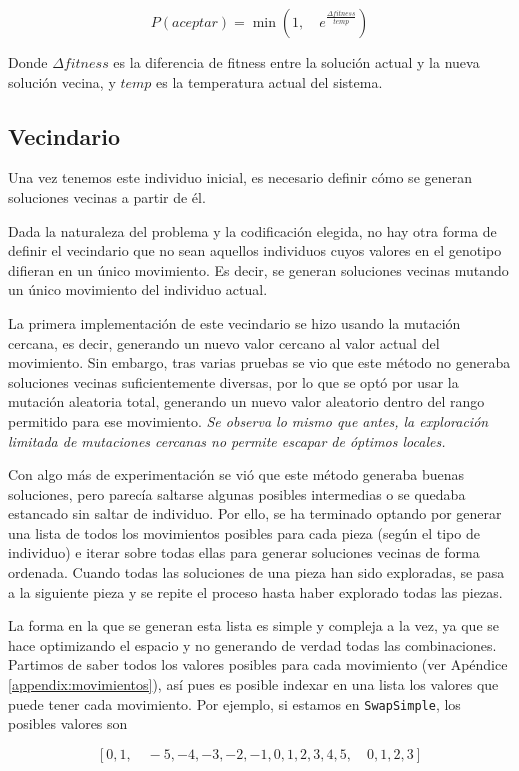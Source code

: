 \documentclass[11pt,spanish,listoffigures,listoftables]{tfgetsinf}
\begin{document}
$$
P(aceptar) = \min(1, \quad e^{\frac{\Delta fitness}{temp}})
$$

Donde $\Delta fitness$ es la diferencia de fitness entre la solución actual y la nueva solución vecina, y $temp$ es la temperatura actual del sistema.

\subsection{Vecindario}
Una vez tenemos este individuo inicial, es necesario definir cómo se generan soluciones vecinas a partir de él.

Dada la naturaleza del problema y la codificación elegida, no hay otra forma de definir el vecindario que no sean aquellos individuos cuyos valores en el genotipo difieran en un único movimiento. Es decir, se generan soluciones vecinas mutando un único movimiento del individuo actual.

La primera implementación de este vecindario se hizo usando la mutación cercana, es decir, generando un nuevo valor cercano al valor actual del movimiento. Sin embargo, tras varias pruebas se vio que este método no generaba soluciones vecinas suficientemente diversas, por lo que se optó por usar la mutación aleatoria total, generando un nuevo valor aleatorio dentro del rango permitido para ese movimiento. \textit{Se observa lo mismo que antes, la exploración limitada de mutaciones cercanas no permite escapar de óptimos locales.}

Con algo más de experimentación se vió que este método generaba buenas soluciones, pero parecía saltarse algunas posibles intermedias o se quedaba estancado sin saltar de individuo. Por ello, se ha terminado optando por generar una lista de todos los movimientos posibles para cada pieza (según el tipo de individuo) e iterar sobre todas ellas para generar soluciones vecinas de forma ordenada. Cuando todas las soluciones de una pieza han sido exploradas, se pasa a la siguiente pieza y se repite el proceso hasta haber explorado todas las piezas.

La forma en la que se generan esta lista es simple y compleja a la vez, ya que se hace optimizando el espacio y no generando de verdad todas las combinaciones. Partimos de saber todos los valores posibles para cada movimiento (ver Apéndice \ref{appendix:movimientos}), así pues es posible indexar en una lista los valores que puede tener cada movimiento. Por ejemplo, si estamos en \texttt{SwapSimple}, los posibles valores son 

$$
[0, 1, \quad -5, -4, -3, -2, -1, 0, 1, 2, 3, 4, 5, \quad 0, 1, 2, 3]
$$
\end{document}
